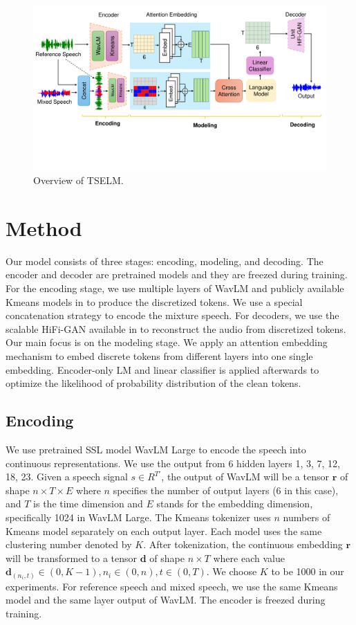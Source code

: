 \documentclass[conference]{IEEEtran}
\begin{document}
\begin{figure}[t]
\centering
\includegraphics[width=\textwidth]{assets/model.pdf}
\caption{Overview of TSELM.}
\label{model}
\end{figure}

\section{Method}
Our model consists of three stages: encoding, modeling, and decoding. The encoder and decoder are 
pretrained models and they are freezed during training. For the encoding stage, we use multiple layers of WavLM 
and publicly available Kmeans 
models in \cite{dasb} to produce the discretized tokens. We use a special concatenation 
strategy to encode the mixture speech. For decoders, we use the scalable HiFi-GAN available in 
\cite{dasb} to reconstruct the audio from discretized tokens. Our main focus is on the
modeling stage. We apply an attention embedding mechanism to embed discrete tokens from different 
layers into one single embedding. Encoder-only LM and linear classifier is applied afterwards to optimize the likelihood of probability 
distribution of the clean tokens. 


\subsection{Encoding}
We use pretrained SSL model WavLM Large \cite{wavlm} to 
encode the speech into continuous representations. We use the output from 6 hidden 
layers 1, 3, 7, 12, 18, 23. Given a speech signal \(s \in R^{T'} \), the output 
of WavLM will be a tensor \(\bm{r}\) of shape \(n \times T \times E\) where 
\(n\) specifies the number 
of output layers (6 in this case), and  \(T\) is the time 
dimension and \(E\) stands for the 
embedding dimension, specifically 1024 in WavLM Large. The Kmeans tokenizer uses \(n\) numbers of  Kmeans model 
separately on each output layer. Each model uses the same clustering number denoted by \(K\).
After tokenization, the continuous embedding \(\bm{r}\) will be transformed to a tensor \(\bm{d}\) of shape \(n \times T\) where each value \(\bm{d}_{(n_i,t)} \in (0, K-1), n_i \in (0,n), t \in 
(0, T)\). We choose \(K\) to be 1000 in our experiments. For reference speech and mixed speech, we 
use the same Kmeans model and the same layer output of WavLM. The encoder is freezed during training.
\end{document}
